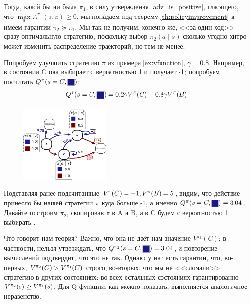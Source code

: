 Тогда, какой бы ни была $\pi_1$, в силу утверждения \ref{adv_is_positive}, гласящего, что $\max\limits_a A^{\pi_1}(s, a) \ge 0$, мы попадаем под теорему \ref{th:policyimprovement} и имеем гарантии $\pi_2 \succeq \pi_1$. Мы так не получим, конечно же, <<за один ход>> сразу оптимальную стратегию, поскольку выбор $\pi_2(a \mid s)$ сколько угодно хитро может изменить распределение траекторий, но тем не менее.

\begin{example}
Попробуем улучшить стратегию $\pi$ из примера \ref{ex:vfunction}, $\gamma = 0.8$. Например, в состоянии C она выбирает  с вероятностью 1 и получает -1; попробуем посчитать $Q^{\pi}(s \HM= C, \colorsquare{ChadBlue})$:
$$
Q^{\pi}(s = C, \colorsquare{ChadBlue}) = 0.2\gamma V^{\pi}(C) + 0.8 \gamma V^{\pi}(B)
$$
\begin{figure}
\vspace{-0.8cm}
\centering
\includegraphics[width=0.4\textwidth]{Images/Value.png}
\end{figure}
Подставляя ранее подсчитанные $V^{\pi}(C) \HM= -1, V^{\pi}(B) \HM= 5$, видим, что действие  принесло бы нашей стратегии $\pi$ куда больше -1, а именно $Q^{\pi}(s = C, \colorsquare{ChadBlue}) \HM= 3.04$. Давайте построим $\pi_2$, скопировав $\pi$ в A и B, а в C будем с вероятностью 1 выбирать .

Что говорит нам теория? Важно, что она не даёт нам значение $V^{\pi_2}(C)$; в частности, нельзя утверждать, что $Q^{\pi_2}(s = C, \colorsquare{ChadBlue}) \HM= 3.04$, и повторение вычислений подтвердит, что это не так. Однако у нас есть гарантии, что, во-первых, $V^{\pi_2}(C) \HM> V^{\pi_1}(C)$ строго, во-вторых, что мы не <<сломали>> стратегию в других состояниях: во всех остальных состояниях гарантированно $V^{\pi_2}(s) \HM\ge V^{\pi_1}(s)$. Для Q-функции, как можно показать, выполняется аналогичное неравенство.
\end{example}

